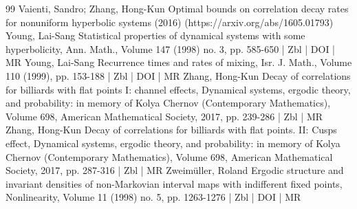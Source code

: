 \documentclass[10pt]{amsart}
\theoremstyle{definition}\newtheorem{defi}[theo]{Definition}\newtheorem{rema}[theo]{Remark}\newtheorem{exam}[theo]{Example}\newtheorem{exem}[theo]{Example}\newtheorem{nota}[theo]{Notation}
\begin{document}
\begin{thebibliography}{99}
Vaienti, Sandro; Zhang, Hong-Kun Optimal bounds on correlation decay rates for nonuniform hyperbolic systems (2016) (https://arxiv.org/abs/1605.01793)
Young, Lai-Sang Statistical properties of dynamical systems with some hyperbolicity, Ann. Math., Volume 147 (1998) no. 3, pp. 585-650 | Zbl | DOI | MR
Young, Lai-Sang Recurrence times and rates of mixing, Isr. J. Math., Volume 110 (1999), pp. 153-188 | Zbl | DOI | MR
Zhang, Hong-Kun Decay of correlations for billiards with flat points I: channel effects, Dynamical systems, ergodic theory, and probability: in memory of Kolya Chernov (Contemporary Mathematics), Volume 698, American Mathematical Society, 2017, pp. 239-286 | Zbl | MR
Zhang, Hong-Kun Decay of correlations for billiards with flat points. II: Cusps effect, Dynamical systems, ergodic theory, and probability: in memory of Kolya Chernov (Contemporary Mathematics), Volume 698, American Mathematical Society, 2017, pp. 287-316 | Zbl | MR
Zweimüller, Roland Ergodic structure and invariant densities of non-Markovian interval maps with indifferent fixed points, Nonlinearity, Volume 11 (1998) no. 5, pp. 1263-1276 | Zbl | DOI | MR
\end{thebibliography}
\end{document}
